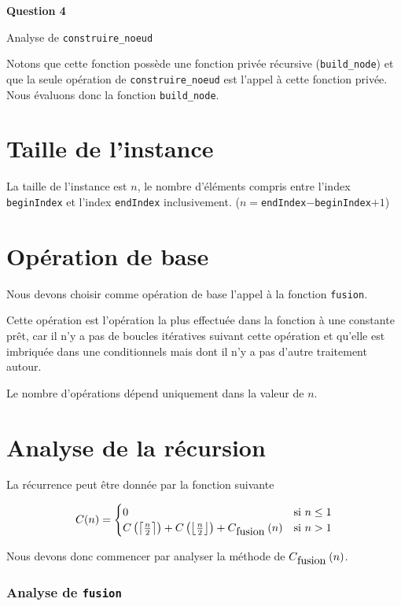 \documentclass[class=article]{standalone}
\begin{document}
 
\centerline{\Huge \bf Question 4}

\centerline{Analyse de \lstinline{construire_noeud}}

Notons que cette fonction possède une fonction privée récursive (\lstinline{build_node}) 
et que la seule opération de \lstinline{construire_noeud}
est l'appel à cette fonction privée. Nous évaluons donc la fonction \lstinline{build_node}.

\section*{Taille de l'instance}

La taille de l'instance est $n$, le nombre d'éléments compris entre
l'index \lstinline{beginIndex} et l'index \lstinline{endIndex} 
inclusivement. ($n = $\lstinline{endIndex}$-$\lstinline{beginIndex}$+1$)

\section*{Opération de base}

Nous devons choisir comme opération de base l'appel à la fonction \lstinline{fusion}.

Cette opération est l'opération la plus effectuée dans la fonction à une constante prêt, car il n'y a pas de boucles 
itératives suivant cette opération et qu'elle est imbriquée dans une conditionnels mais dont il n'y a pas d'autre traitement autour.

Le nombre d'opérations dépend uniquement dans la valeur de $n$.

\section*{Analyse de la récursion}

La récurrence peut être donnée par la fonction suivante

\[
  C(n) =
  \begin{cases}
    0 & \text{si } n \leq 1 \\
    C\pars{\ceil{\frac{n}{2}}} + C\pars{\floor{\frac{n}{2}}} + C_{\lstinline{fusion}}\pars{n}  & \text{si } n > 1 \\
  \end{cases}
\]

Nous devons donc commencer par analyser la méthode de $C_{\lstinline{fusion}}\pars{n}$.

\subsubsection*{Analyse de \lstinline{fusion}}
\end{document}
